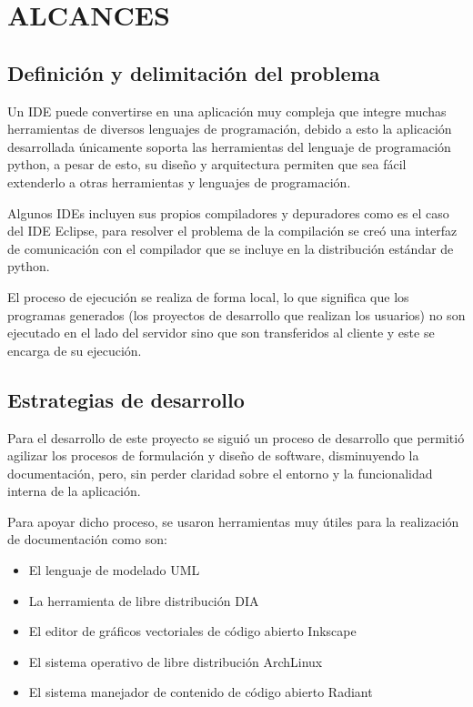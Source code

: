 \section{ALCANCES}

\subsection{Definición y delimitación del problema}

Un IDE puede convertirse en una aplicación muy compleja que integre muchas herramientas de diversos lenguajes de programación, debido a esto la aplicación desarrollada únicamente soporta las herramientas del lenguaje de programación python, a pesar de esto, su diseño y arquitectura permiten que sea fácil extenderlo a otras herramientas y lenguajes de programación.

Algunos IDEs incluyen sus propios compiladores y depuradores como es el caso del IDE Eclipse, para resolver el problema de la compilación se creó una interfaz de comunicación con el compilador que se incluye en la distribución estándar de python.

El proceso de ejecución se realiza de forma local, lo que significa que los programas generados (los proyectos de desarrollo que realizan los usuarios) no son ejecutado en el lado del servidor sino que son transferidos al cliente y este se encarga de su ejecución.

\subsection{Estrategias de desarrollo}

Para el desarrollo de este proyecto se siguió un proceso de desarrollo que permitió agilizar los procesos de formulación y diseño de software, disminuyendo la documentación, pero, sin perder claridad sobre el entorno y la funcionalidad interna de la aplicación.

Para apoyar dicho proceso, se usaron herramientas muy útiles para la realización de documentación como son:

\begin{itemize}
	\item El lenguaje de modelado UML \cite{uml}
	\item La herramienta de libre distribución DIA \cite{dia}
	\item El editor de gráficos vectoriales de código abierto Inkscape \cite{inkscape}
	\item El sistema operativo de libre distribución ArchLinux \cite{archlinux}
	\item El sistema manejador de contenido de código abierto Radiant \cite{radiant}
\end{itemize}